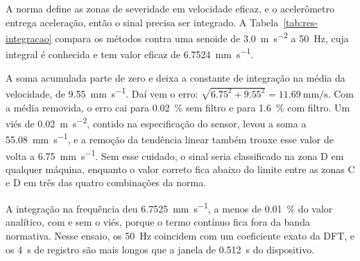 A norma define as zonas de severidade em velocidade eficaz, e o acelerômetro entrega
aceleração, então o sinal precisa ser integrado. A Tabela~\ref{tab:res-integracao} compara os
métodos contra uma senoide de \SI{3,0}{\meter\per\second\squared} a \SI{50}{\hertz}, cuja
integral é conhecida e tem valor eficaz de \SI{6,7524}{\milli\meter\per\second}.

\begin{table}[!htb]
\end{table}

A soma acumulada parte de zero e deixa a constante de integração na média da velocidade, de
\SI{9,55}{\milli\meter\per\second}. Daí vem o erro: $\sqrt{\num{6,75}^2 + \num{9,55}^2} =
\SI{11,69}{\milli\meter\per\second}$. Com a média removida, o erro cai para
\SI{0,02}{\percent} sem filtro e para \SI{1,6}{\percent} com filtro. Um viés de
\SI{0,02}{\meter\per\second\squared}, contido na especificação do sensor, levou a soma a
\SI{55,08}{\milli\meter\per\second}, e a remoção da tendência linear também trouxe esse valor
de volta a \SI{6,75}{\milli\meter\per\second}. Sem esse cuidado, o sinal seria classificado na
zona D em qualquer máquina, enquanto o valor correto fica abaixo do limite entre as zonas C e
D em três das quatro combinações da norma.

A integração na frequência deu \SI{6,7525}{\milli\meter\per\second}, a menos de
\SI{0,01}{\percent} do valor analítico, com e sem o viés, porque o termo contínuo fica fora da
banda normativa. Nesse ensaio, os \SI{50}{\hertz} coincidem com um coeficiente exato da DFT, e
os \SI{4}{\second} de registro são mais longos que a janela de \SI{0,512}{\second} do
dispositivo.

